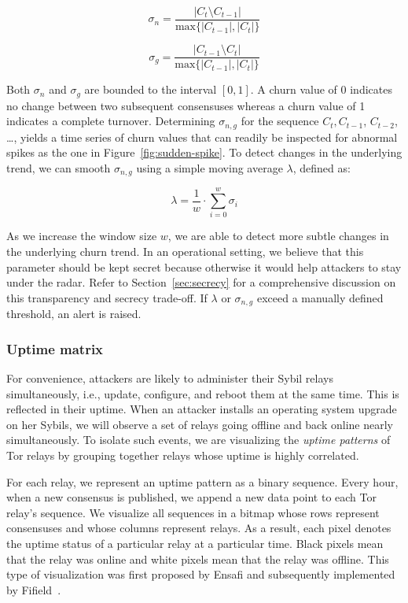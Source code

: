 \begin{equation}
\sigma_{n} = \frac{\lvert C_{t} \setminus C_{t-1} \rvert}
{\textrm{max}\{\lvert C_{t-1} \rvert, \lvert C_{t} \rvert \}}
\end{equation}

\begin{equation}
\sigma_{g} = \frac{\lvert C_{t-1} \setminus C_{t} \rvert}
{\textrm{max}\{\lvert C_{t-1} \rvert, \lvert C_{t} \rvert \}}
\end{equation}

Both $\sigma_{n}$ and $\sigma_{g}$ are bounded to the interval $[0, 1]$.  A
churn value of 0 indicates no change between two subsequent consensuses whereas
a churn value of 1 indicates a complete turnover.  Determining $\sigma_{n,g}$
for the sequence $C_{t}, C_{t-1}$, $C_{t-2}$, \ldots, yields a time series of
churn values that can readily be inspected for abnormal spikes as the one in
Figure~\ref{fig:sudden-spike}.  To detect changes in the underlying trend, we
can smooth $\sigma_{n,g}$ using a simple moving average $\lambda$, defined as:

\begin{equation}
\lambda = \frac{1}{w} \cdot \sum_{i=0}^{w} \sigma_{i}
\end{equation}

As we increase the window size $w$, we are able to detect more subtle changes in
the underlying churn trend.  In an operational setting, we believe that this
parameter should be kept secret because otherwise it would help attackers to
stay under the radar.  Refer to Section~\ref{sec:secrecy} for a comprehensive
discussion on this transparency and secrecy trade-off.  If $\lambda$ or
$\sigma_{n,g}$ exceed a manually defined threshold, an alert is raised.

\subsubsection{Uptime matrix}
\label{sec:uptime-matrix}
For convenience, attackers are likely to administer their Sybil relays
simultaneously, i.e., update, configure, and reboot them at the same time.  This
is reflected in their uptime.  When an attacker installs an operating system
upgrade on her Sybils, we will observe a set of relays going offline and back
online nearly simultaneously.  To isolate such events, we are visualizing the
\emph{uptime patterns} of Tor relays by grouping together relays whose uptime is
highly correlated.

For each relay, we represent an uptime pattern as a binary sequence.  Every
hour, when a new consensus is published, we append a new data point to each Tor
relay's sequence.  We visualize all sequences in a bitmap whose rows represent
consensuses and whose columns represent relays.  As a result, each pixel denotes
the uptime status of a particular relay at a particular time.  Black pixels mean
that the relay was online and white pixels mean that the relay was offline.
This type of visualization was first proposed by Ensafi and subsequently
implemented by Fifield~\cite{Fifield2014a}.

